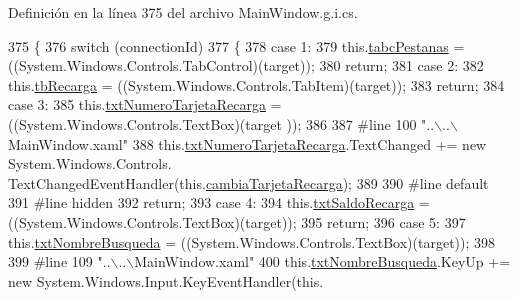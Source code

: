 Definición en la línea 375 del archivo Main\-Window.\-g.\-i.\-cs.


\begin{DoxyCode}
375                                                                                                 \{
376             \textcolor{keywordflow}{switch} (connectionId)
377             \{
378             \textcolor{keywordflow}{case} 1:
379             this.\hyperlink{class_proyecto___integrador__3_1_1_main_window_a46bffd3bc6bf702252e6568b9c00f35c}{tabcPestanas} = ((System.Windows.Controls.TabControl)(target));
380             \textcolor{keywordflow}{return};
381             \textcolor{keywordflow}{case} 2:
382             this.\hyperlink{class_proyecto___integrador__3_1_1_main_window_af0f488983962bf0457a4b9d02c1df2a6}{tbRecarga} = ((System.Windows.Controls.TabItem)(target));
383             \textcolor{keywordflow}{return};
384             \textcolor{keywordflow}{case} 3:
385             this.\hyperlink{class_proyecto___integrador__3_1_1_main_window_a921e64f5a9f1531f12802b32f06bf71b}{txtNumeroTarjetaRecarga} = ((System.Windows.Controls.TextBox)(target
      ));
386             
387 \textcolor{preprocessor}{            #line 100 "..\(\backslash\)..\(\backslash\)MainWindow.xaml"}
388 \textcolor{preprocessor}{}            this.\hyperlink{class_proyecto___integrador__3_1_1_main_window_a921e64f5a9f1531f12802b32f06bf71b}{txtNumeroTarjetaRecarga}.TextChanged += \textcolor{keyword}{new} System.Windows.Controls.
      TextChangedEventHandler(this.\hyperlink{class_proyecto___integrador__3_1_1_main_window_ae62fbb5bc9da0f805d207465ef0ac41a}{cambiaTarjetaRecarga});
389             
390 \textcolor{preprocessor}{            #line default}
391 \textcolor{preprocessor}{}\textcolor{preprocessor}{            #line hidden}
392 \textcolor{preprocessor}{}            \textcolor{keywordflow}{return};
393             \textcolor{keywordflow}{case} 4:
394             this.\hyperlink{class_proyecto___integrador__3_1_1_main_window_aeb68364159bb1ed1dbf417a205fd3519}{txtSaldoRecarga} = ((System.Windows.Controls.TextBox)(target));
395             \textcolor{keywordflow}{return};
396             \textcolor{keywordflow}{case} 5:
397             this.\hyperlink{class_proyecto___integrador__3_1_1_main_window_a8b7a97d30e0788fb2ff72eaee1d0ab88}{txtNombreBusqueda} = ((System.Windows.Controls.TextBox)(target));
398             
399 \textcolor{preprocessor}{            #line 109 "..\(\backslash\)..\(\backslash\)MainWindow.xaml"}
400 \textcolor{preprocessor}{}            this.\hyperlink{class_proyecto___integrador__3_1_1_main_window_a8b7a97d30e0788fb2ff72eaee1d0ab88}{txtNombreBusqueda}.KeyUp += \textcolor{keyword}{new} System.Windows.Input.KeyEventHandler(this.

\end{DoxyCode}
